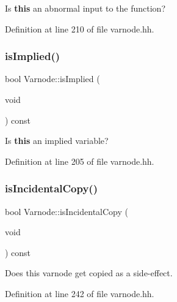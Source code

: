 Is {\bfseries{this}} an abnormal input to the function? 



Definition at line 210 of file varnode.\+hh.

\mbox{\label{class_varnode_a0e839165ea052660faee8b9222c6e910}} 
\subsubsection{\texorpdfstring{isImplied()}{isImplied()}}
{\footnotesize\ttfamily bool Varnode\+::is\+Implied (\begin{DoxyParamCaption}\item[{void}]{ }\end{DoxyParamCaption}) const\hspace{0.3cm}{\ttfamily [inline]}}



Is {\bfseries{this}} an implied variable? 



Definition at line 205 of file varnode.\+hh.

\mbox{\label{class_varnode_a512b300f3dc01c9bdb03242c05c8a932}} 
\subsubsection{\texorpdfstring{isIncidentalCopy()}{isIncidentalCopy()}}
{\footnotesize\ttfamily bool Varnode\+::is\+Incidental\+Copy (\begin{DoxyParamCaption}\item[{void}]{ }\end{DoxyParamCaption}) const\hspace{0.3cm}{\ttfamily [inline]}}



Does this varnode get copied as a side-\/effect. 



Definition at line 242 of file varnode.\+hh.

\mbox{\label{class_varnode_a232e7f2c37583404969a8dfb0fb4adae}} 
